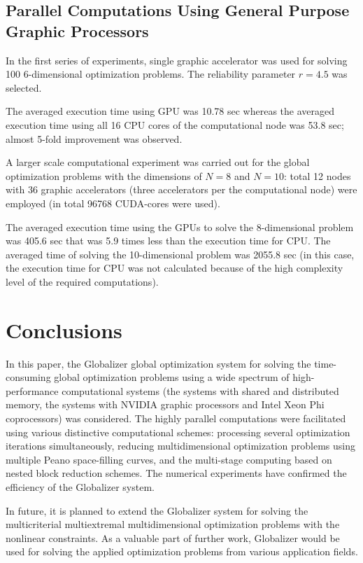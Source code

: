 \documentclass{naco}
\theoremstyle{definition}
\begin{document}
\subsection{Parallel Computations Using General Purpose Graphic Processors}
In the first series of experiments, single graphic accelerator was used for solving 100
6-dimensional optimization problems. The reliability parameter \(r=4.5\) was selected.
\par
The averaged execution time using GPU was 10.78 sec whereas the averaged execution
time using all 16 CPU cores of the computational node was 53.8 sec; almost 5-fold improvement was observed.
\par
A larger scale computational experiment was carried out for the global optimization
problems with the dimensions of \(N = 8\) and \(N = 10\): total 12 nodes with 36 graphic
accelerators (three accelerators per the computational node) were employed (in total 96768 CUDA-cores were used).
\par
The averaged execution time using the GPUs to solve the 8-dimensional problem was
405.6 sec that was 5.9 times less than the execution time for CPU. The averaged time
of solving the 10-dimensional problem was 2055.8 sec (in this case, the execution time for CPU
was not calculated because of the high complexity level of the required computations).

\section{Conclusions} \label{sec:concl}

In this paper, the Globalizer global optimization system for solving the time-consuming global optimization problems using a wide spectrum of high-performance computational systems (the systems with shared and distributed memory, the systems with NVIDIA graphic processors and Intel Xeon Phi coprocessors) was considered. The highly parallel computations were facilitated using various distinctive computational schemes: processing several optimization iterations simultaneously, reducing multidimensional optimization problems using multiple Peano space-filling curves, and the multi-stage computing based on nested block reduction schemes. The numerical experiments have confirmed the efficiency of the Globalizer system.

In future, it is planned to extend the Globalizer system for solving the multicriterial multiextremal multidimensional optimization problems with the nonlinear constraints. As a valuable part of further work, Globalizer would be used for solving the applied optimization problems from various application fields.
%
%
\end{document}
